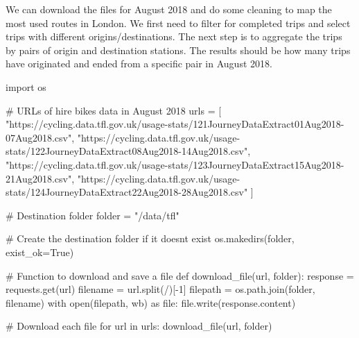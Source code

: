 \documentclass[
  letterpaper,
  DIV=11,
  numbers=noendperiod]{scrreprt}
\newenvironment{Shaded}{\begin{snugshade}}{\end{snugshade}}
\newcommand{\BuiltInTok}[1]{\textcolor[rgb]{0.00,0.23,0.31}{#1}}
\newcommand{\CommentTok}[1]{\textcolor[rgb]{0.37,0.37,0.37}{#1}}
\newcommand{\ControlFlowTok}[1]{\textcolor[rgb]{0.00,0.23,0.31}{#1}}
\newcommand{\DecValTok}[1]{\textcolor[rgb]{0.68,0.00,0.00}{#1}}
\newcommand{\ImportTok}[1]{\textcolor[rgb]{0.00,0.46,0.62}{#1}}
\newcommand{\KeywordTok}[1]{\textcolor[rgb]{0.00,0.23,0.31}{#1}}
\newcommand{\NormalTok}[1]{\textcolor[rgb]{0.00,0.23,0.31}{#1}}
\newcommand{\OperatorTok}[1]{\textcolor[rgb]{0.37,0.37,0.37}{#1}}
\newcommand{\StringTok}[1]{\textcolor[rgb]{0.13,0.47,0.30}{#1}}
\newcommand{\VariableTok}[1]{\textcolor[rgb]{0.07,0.07,0.07}{#1}}
\begin{document}
We can download the files for August 2018 and do some cleaning to map
the most used routes in London. We first need to filter for completed
trips and select trips with different origins/destinations. The next
step is to aggregate the trips by pairs of origin and destination
stations. The results should be how many trips have originated and ended
from a specific pair in August 2018.

\begin{Shaded}
\begin{Highlighting}[]
\ImportTok{import}\NormalTok{ os}

\CommentTok{\# URLs of hire bikes data in August 2018}
\NormalTok{urls }\OperatorTok{=}\NormalTok{ [}
    \StringTok{"https://cycling.data.tfl.gov.uk/usage{-}stats/121JourneyDataExtract01Aug2018{-}07Aug2018.csv"}\NormalTok{,}
    \StringTok{"https://cycling.data.tfl.gov.uk/usage{-}stats/122JourneyDataExtract08Aug2018{-}14Aug2018.csv"}\NormalTok{,}
    \StringTok{"https://cycling.data.tfl.gov.uk/usage{-}stats/123JourneyDataExtract15Aug2018{-}21Aug2018.csv"}\NormalTok{,}
    \StringTok{"https://cycling.data.tfl.gov.uk/usage{-}stats/124JourneyDataExtract22Aug2018{-}28Aug2018.csv"}
\NormalTok{    ]}

\CommentTok{\# Destination folder}
\NormalTok{folder }\OperatorTok{=} \StringTok{"/data/tfl"}

\CommentTok{\# Create the destination folder if it doesn\textquotesingle{}t exist}
\NormalTok{os.makedirs(folder, exist\_ok}\OperatorTok{=}\VariableTok{True}\NormalTok{)}

\CommentTok{\# Function to download and save a file}
\KeywordTok{def}\NormalTok{ download\_file(url, folder):}
\NormalTok{    response }\OperatorTok{=}\NormalTok{ requests.get(url)}
\NormalTok{    filename }\OperatorTok{=}\NormalTok{ url.split(}\StringTok{\textquotesingle{}/\textquotesingle{}}\NormalTok{)[}\OperatorTok{{-}}\DecValTok{1}\NormalTok{]}
\NormalTok{    filepath }\OperatorTok{=}\NormalTok{ os.path.join(folder, filename)}
    \ControlFlowTok{with} \BuiltInTok{open}\NormalTok{(filepath, }\StringTok{\textquotesingle{}wb\textquotesingle{}}\NormalTok{) }\ImportTok{as} \BuiltInTok{file}\NormalTok{:}
        \BuiltInTok{file}\NormalTok{.write(response.content)}

\CommentTok{\# Download each file}
\ControlFlowTok{for}\NormalTok{ url }\KeywordTok{in}\NormalTok{ urls:}
\NormalTok{    download\_file(url, folder)}
\end{Highlighting}
\end{Shaded}
\end{document}
